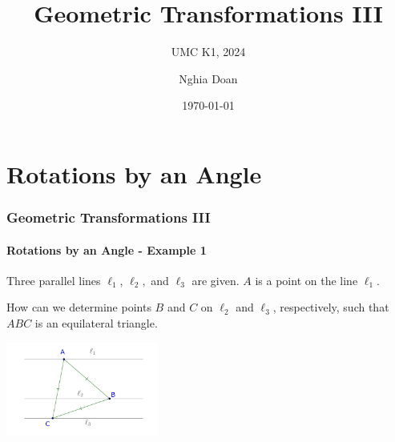 \documentclass[8pt,xcolor=table,dvipsnames]{beamer}
\title{Geometric Transformations III}
\subtitle{UMC K1, 2024}
\author{Nghia Doan}
\institute{MCC Club \& Competitions}
\date{\today}
\begin{document}
\section{Rotations by an Angle}

\begin{frame}[t]
    \frametitle{Geometric Transformations III}
    \framesubtitle{Rotations by an Angle - Example 1}
    \begin{example}
        Three parallel lines $\ell_1$, $\ell_2,$ and $\ell_3$ are given. $A$ is a point on the line $\ell_1$.
        
        \bigbreak
        How can we determine points $B$ and $C$ on $\ell_2$ and $\ell_3$, respectively, such that $ABC$ is an equilateral triangle.
    \end{example}

    \begin{center}
        \includegraphics[width=5cm]{./svg/pdf/rotation-4a.pdf}
    \end{center}
\end{frame}
\end{document}
